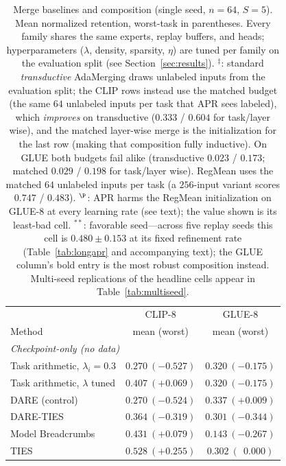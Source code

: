 \documentclass[11pt]{article}
\begin{document}
\begin{table}[t]
\centering
\small
\caption{Merge baselines and composition (single seed, $n=64$, $S=5$). Mean normalized retention, worst-task in parentheses. Every family shares the same experts, replay buffers, and heads; hyperparameters ($\lambda$, density, sparsity, $\eta$) are tuned per family on the evaluation split (see Section~\ref{sec:results}). $^\ddagger$: standard \emph{transductive} AdaMerging draws unlabeled inputs from the evaluation split; the CLIP rows instead use the matched budget (the same $64$ unlabeled inputs per task that APR sees labeled), which \emph{improves} on transductive ($0.333$ / $0.604$ for task/layer wise), and the matched layer-wise merge is the initialization for the last row (making that composition fully inductive). On GLUE both budgets fail alike (transductive $0.023$ / $0.173$; matched $0.029$ / $0.198$ for task/layer wise). RegMean uses the matched $64$ unlabeled inputs per task (a $256$-input variant scores $0.747$ / $0.483$). $^\P$: APR harms the RegMean initialization on GLUE-8 at every learning rate (see text); the value shown is its least-bad cell. $^{**}$: favorable seed---across five replay seeds this cell is $0.480\pm0.153$ at its fixed refinement rate (Table~\ref{tab:longapr} and accompanying text); the GLUE column's bold entry is the most robust composition instead. Multi-seed replications of the headline cells appear in Table~\ref{tab:multiseed}.}
\label{tab:mergebaselines}
\begin{tabular}{lcc}
\toprule
 & CLIP-8 & GLUE-8 \\
Method & mean (worst) & mean (worst) \\
\midrule
\multicolumn{3}{l}{\emph{Checkpoint-only (no data)}}\\
Task arithmetic, $\lambda_i=0.3$          & $0.270\ (-0.527)$          & $0.320\ (-0.175)$ \\
Task arithmetic, $\lambda$ tuned          & $0.407\ (+0.069)$          & $0.320\ (-0.175)$ \\
DARE (control)                            & $0.270\ (-0.524)$          & $0.337\ (+0.009)$ \\
DARE-TIES                                 & $0.364\ (-0.319)$          & $0.301\ (-0.344)$ \\
Model Breadcrumbs                         & $0.431\ (+0.079)$          & $0.143\ (-0.267)$ \\
TIES                                      & $0.528\ (+0.255)$          & $0.302\ (\ \ 0.000)$ \\

\end{tabular}
\end{table}
\end{document}

